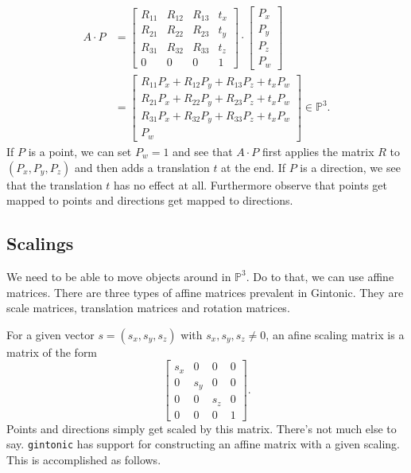 \documentclass{article}
\begin{document}
\begin{align*}
A \cdot P &= \begin{bmatrix}
	R_{11} & R_{12} & R_{13} & t_{x} \\
	R_{21} & R_{22} & R_{23} & t_{y} \\
	R_{31} & R_{32} & R_{33} & t_{z} \\
	0      &      0 &      0 & 1 \end{bmatrix} \cdot \begin{bmatrix} P_x \\ P_y \\ P_z \\ P_w \end{bmatrix} \\
	&= \begin{bmatrix}
	R_{11} P_x + R_{12} P_y + R_{13} P_z + t_x P_w \\
	R_{21} P_x + R_{22} P_y + R_{23} P_z + t_x P_w \\
	R_{31} P_x + R_{32} P_y + R_{33} P_z + t_x P_w \\
	P_w
	\end{bmatrix} \in \mathbb{P}^3.
\end{align*}
If $P$ is a point, we can set $P_w = 1$ and see that $A \cdot P$ first applies the matrix $R$ to $(P_x, P_y, P_z)$ and then adds a translation $t$ at the end. If $P$ is a direction, we see that the translation $t$ has no effect at all. Furthermore observe that points get mapped to points and directions get mapped to directions.

\subsection{Scalings}

We need to be able to move objects around in $\mathbb{P}^3$. Do to that, we can use affine matrices. There are three types of affine matrices prevalent in Gintonic. They are scale matrices, translation matrices and rotation matrices.

For a given vector $s = (s_x,s_y,s_z)$ with $s_x,s_y,s_z \neq 0$, an afine scaling matrix is a matrix of the form
\[ \begin{bmatrix} s_x & 0 & 0 & 0 \\ 0 & s_y & 0 & 0 \\ 0 & 0 & s_z & 0 \\ 0 & 0 & 0 & 1 \end{bmatrix}. \]
Points and directions simply get scaled by this matrix. There's not much else to say. \texttt{gintonic} has support for constructing an affine matrix with a given scaling. This is accomplished as follows.
\end{document}
